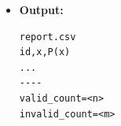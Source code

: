 \begin{itemize}
\begin{itemize}
        \item \textbf{Module 4 (Tính P(x) bằng Horner):}
\begin{lstlisting}
res = a[n];
for (i = n - 1; i >= 0; --i)
    res = res * x + a[i];
\end{lstlisting}

        \item \textbf{Module 5 (Ghi report.csv):}
        \begin{itemize}
            \item Header: \texttt{id,x,P(x)}
            \item Mỗi dòng: kết quả tính được
            \item Cuối file ghi thống kê
        \end{itemize}
    \end{itemize}

    \item \textbf{Output:}
\begin{lstlisting}
report.csv
id,x,P(x)
...
----
valid_count=<n>
invalid_count=<m>
\end{lstlisting}
\end{itemize}

